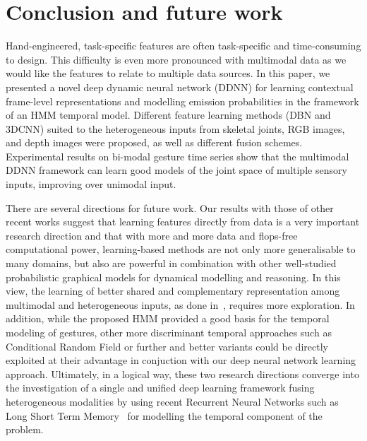 
\section{Conclusion and future work}
\label{sec:conclusion}

Hand-engineered, task-specific features are often task-specific and time-consuming to design. %
This difficulty is even more pronounced with multimodal data as we would like the features
to relate to multiple data sources.
%
In this paper, we presented a novel deep dynamic neural network (DDNN)
for learning contextual frame-level representations and modelling emission probabilities in the framework of an HMM temporal model.
%
Different feature learning methods (DBN and 3DCNN) suited to the heterogeneous inputs from skeletal joints, RGB images, and depth images
were proposed, as well as different fusion schemes.
%
Experimental results on bi-modal gesture time series  show that the multimodal DDNN framework can learn
good models of the joint space of multiple sensory inputs, improving over  unimodal input.



There are several directions for future work.
%
Our results with those of other recent works suggest that learning features directly from data is a very important research direction
and that with more and more data and flops-free  computational power, learning-based methods are not only more generalisable to many domains,
but also are powerful in combination  with other well-studied probabilistic graphical models
for dynamical modelling and reasoning.
%
In this view, the learning of  better shared and complementary representation among multimodal  and heterogeneous  inputs,
as done in~\cite{neverova2014moddrop}, requires more exploration.
%
In addition, while the proposed HMM provided a good basis for the temporal modeling of gestures,
other more discriminant temporal approaches such as Conditional Random Field or further and better variants
\cite{wang2006hidden} could be directly exploited at their advantage in conjuction with our deep neural network  learning approach.
%
Ultimately, in a logical way, these two research directions converge into the investigation of
a single and unified deep learning framework fusing heterogeneous modalities
by using recent Recurrent Neural Networks such as Long Short Term Memory~\cite{graves2009novel} for modelling the temporal component of the problem.


\endinput

